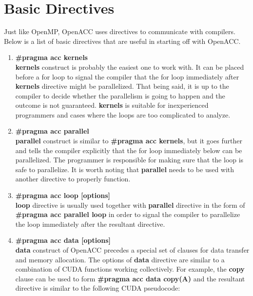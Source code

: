 \documentclass[ebook,10pt,oneside,openany]{memoir}
\begin{document}
\section{Basic Directives}
Just like OpenMP, OpenACC uses directives to communicate with compilers. Below is a list of basic directives that are useful in starting off with OpenACC.
\begin{enumerate}
\item \textbf{\#pragma acc kernels} \\
\textbf{kernels} construct is probably the easiest one to work with. It can be placed before a for loop to signal the compiler that the for loop immediately after \textbf{kernels} directive might be parallelized. That being said, it is up to the compiler to decide whether the parallelism is going to happen and the outcome is not guaranteed. \textbf{kernels} is suitable for inexperienced programmers and cases where the loops are too complicated to analyze.

\item \textbf{\#pragma acc parallel} \\
\textbf{parallel} construct is similar to \textbf{\#pragma acc kernels}, but it goes further and tells the compiler explicitly that the for loop immediately below can be parallelized. The programmer is responsible for making sure that the loop is safe to parallelize. It is worth noting that \textbf{parallel} needs to be used with another directive to properly function.
 
\item \textbf{\#pragma acc loop [options]} \\
\textbf{loop} directive is usually used together with \textbf{parallel} directive in the form of  \textbf{\#pragma acc parallel loop} in order to signal the compiler to parallelize the loop immediately after the resultant directive.

\item \textbf{\#pragma acc data [options]} \\
\textbf{data} construct of OpenACC precedes a special set of clauses for data transfer and memory allocation. The options of \textbf{data} directive are similar to a combination of CUDA functions working collectively. For example, the \textbf{copy} clause can be used to form \textbf{\#pragma acc data copy(A)} and the resultant directive is similar to the following CUDA pseudocode:



\end{enumerate}
\end{document}
